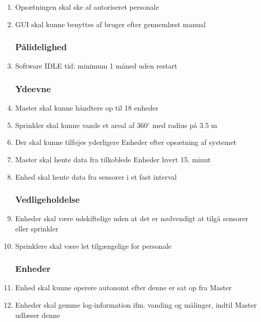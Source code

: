 \begin{enumerate}

\subsubsection*{Brugbarhed}
\item Opsætningen skal ske af autoriseret personale
\item GUI skal kunne benyttes af bruger efter gennemlæst manual


\subsubsection*{Pålidelighed}
\item Software IDLE tid: minimum 1 måned uden restart


\subsubsection*{Ydeevne}
\item Master skal kunne håndtere op til 18 enheder
\item Sprinkler skal kunne vande et areal af 360$^{\circ}$ med radius på 3.5 m 
\item Der skal kunne tilføjes yderligere Enheder efter opsætning af systemet
\item Master skal hente data fra tilkoblede Enheder hvert 15. minut
\item Enhed skal hente data fra sensorer i et fast interval


\subsubsection*{Vedligeholdelse}
\item Enheder skal være udskiftelige uden at det er nødvendigt at tilgå sensorer eller sprinkler
\item Sprinklere skal være let tilgængelige for personale


\subsubsection*{Enheder}
\item Enhed skal kunne operere autonomt efter denne er sat op fra Master
\item Enheder skal gemme log-information ifm. vanding og målinger, indtil Master udlæser denne

\end{enumerate}

